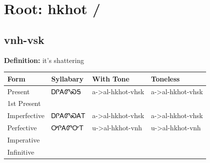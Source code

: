 \documentclass{article}%
\begin{document}
%
\normalsize%
\section*{Root: hkhot / }%
\subsection*{vnh-vsk}%
\textbf{Definition: }%
it’s shattering%
\\[0.5em]%
\begin{tabular}{|l|l|l|l|}%
\hline%
\textbf{Form}&\textbf{Syllabary}&\textbf{With Tone}&\textbf{Toneless}\\%
\hline%
Present&ᎠᎵᎪᏛᏍᎦ&a{-}>al{-}hkhot{-}vhsk&a{-}>al{-}hkhot{-}vhsk\\%
1st Present&&&\\%
Imperfective&ᎠᎵᎪᏛᏍᎪᎢ&a{-}>al{-}hkhot{-}vhsk&a{-}>al{-}hkhot{-}vhsk\\%
Perfective&ᎤᎵᎪᏛᏅᎢ&u{-}>al{-}hkhot{-}vnh&u{-}>al{-}hkhot{-}vnh\\%
Imperative&&&\\%
Infinitive&&&\\%
\hline%
\end{tabular}%
\\[1em]%
\end{document}
